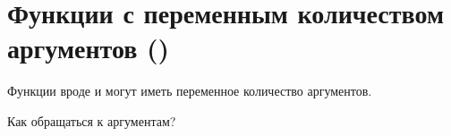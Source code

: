 \section{Функции с переменным количеством аргументов ()}

Функции вроде \printf и \scanf могут иметь переменное количество аргументов.

Как обращаться к аргументам?



